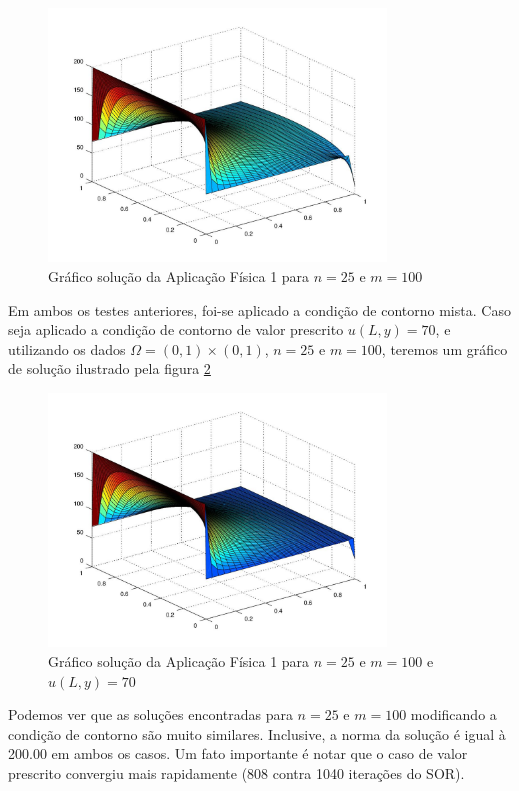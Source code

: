 \documentclass[
	11pt,				%
	oneside,			%
	a4paper,			%
	english,			%
	brazil,				%
	]{article}
\begin{document}
\begin{figure}[h]
    \centering
    \includegraphics[width=0.8\textwidth]{a1_25-100}
    \caption{Gráfico solução da Aplicação Física 1 para $n = 25$ e $m = 100$}
    \label{fig:a1_25-100}
\end{figure}

Em ambos os testes anteriores, foi-se aplicado a condição de contorno mista. 
Caso seja aplicado a condição de contorno de valor prescrito $u(L, y) =
70$, e utilizando os dados $\Omega = (0,1)\times(0,1)$, $n = 25$ e $m = 100$, 
teremos um gráfico de solução ilustrado pela figura \ref{fig:a170_25-100}

\begin{figure}[h]
    \centering
    \includegraphics[width=0.8\textwidth]{a170_25-100}
    \caption{Gráfico solução da Aplicação Física 1 para $n = 25$ e $m = 100$ e 
$u(L, y) = 70$}
    \label{fig:a170_25-100}
\end{figure}

Podemos ver que as soluções encontradas para $n = 25$ e $m = 100$ modificando a 
condição de contorno são muito similares. Inclusive, a norma da solução é igual 
à 200.00 em ambos os casos. Um fato importante é notar que o caso de valor 
prescrito convergiu mais rapidamente (808 contra 1040 iterações do SOR).
\end{document}
